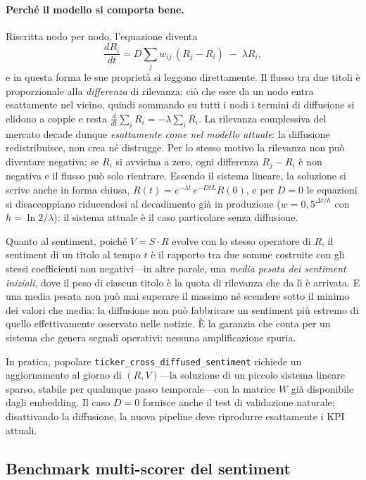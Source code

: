 \paragraph{Perché il modello si comporta bene.}
Riscritta nodo per nodo, l'equazione diventa
\[
\frac{dR_i}{dt} = D \sum_j w_{ij}\,(R_j - R_i) \; - \; \lambda R_i,
\]
e in questa forma le sue proprietà si leggono direttamente.
Il flusso tra due titoli è proporzionale alla \emph{differenza} di rilevanza: ciò che esce da un nodo entra esattamente nel vicino, quindi sommando su tutti i nodi i termini di diffusione si elidono a coppie e resta $\frac{d}{dt}\sum_i R_i = -\lambda \sum_i R_i$.
La rilevanza complessiva del mercato decade dunque \emph{esattamente come nel modello attuale}: la diffusione redistribuisce, non crea né distrugge.
Per lo stesso motivo la rilevanza non può diventare negativa: se $R_i$ si avvicina a zero, ogni differenza $R_j - R_i$ è non negativa e il flusso può solo rientrare.
Essendo il sistema lineare, la soluzione si scrive anche in forma chiusa, $R(t) = e^{-\lambda t}\, e^{-DtL} R(0)$, e per $D = 0$ le equazioni si disaccoppiano riducendosi al decadimento già in produzione ($w = 0{,}5^{\Delta t/h}$ con $h = \ln 2/\lambda$): il sistema attuale è il caso particolare senza diffusione.

Quanto al sentiment, poiché $V = S \cdot R$ evolve con lo stesso operatore di $R$, il sentiment di un titolo al tempo $t$ è il rapporto tra due somme costruite con gli stessi coefficienti non negativi---in altre parole, una \emph{media pesata dei sentiment iniziali}, dove il peso di ciascun titolo è la quota di rilevanza che da lì è arrivata.
E una media pesata non può mai superare il massimo né scendere sotto il minimo dei valori che media: la diffusione non può fabbricare un sentiment più estremo di quello effettivamente osservato nelle notizie.
È la garanzia che conta per un sistema che genera segnali operativi: nessuna amplificazione spuria.

In pratica, popolare \texttt{ticker\_cross\_diffused\_sentiment} richiede un aggiornamento al giorno di $(R, V)$---la soluzione di un piccolo sistema lineare sparso, stabile per qualunque passo temporale---con la matrice $W$ già disponibile dagli embedding.
Il caso $D = 0$ fornisce anche il test di validazione naturale: disattivando la diffusione, la nuova pipeline deve riprodurre esattamente i KPI attuali.

\subsection{Benchmark multi-scorer del sentiment}


